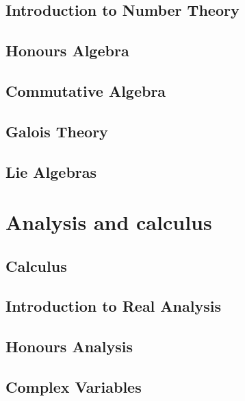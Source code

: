 \documentclass[12pt]{report}
\begin{document}
\chapter{Introduction to Number Theory}\label{cha:intr-numb-theory}

\chapter{Honours Algebra}\label{cha:honours-algebra}

\chapter{Commutative Algebra}\label{cha:commutative-algebra}

\chapter{Galois Theory}\label{cha:galois-theory}

\chapter{Lie Algebras}\label{cha:lie-algebras}




\part{Analysis and calculus}

\chapter{Calculus}\label{cha:calculus}

\chapter{Introduction to Real Analysis}\label{cha:intr-real-analys}

\chapter{Honours Analysis}\label{cha:honours-analysis}

\chapter{Complex Variables}\label{cha:complex-variables}
\end{document}
